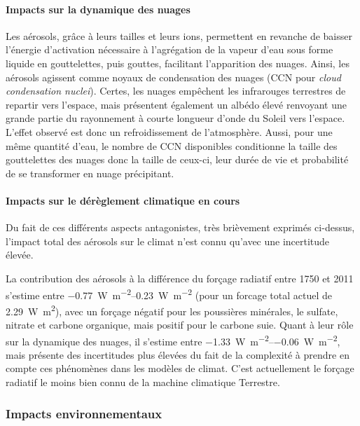 \paragraph{Impacts sur la dynamique des nuages}%
\label{par:noyaux_de_condensation_des_nuages}

Les aérosols, grâce à leurs tailles et leurs ions, permettent en revanche de baisser
l'énergie d'activation nécessaire à l'agrégation de la vapeur d'eau sous forme liquide en
gouttelettes, puis gouttes, facilitant l'apparition des nuages. Ainsi, les aérosols agissent
comme noyaux de condensation des nuages (CCN pour \textit{cloud condensation nuclei}).
Certes, les nuages empêchent les infrarouges terrestres de repartir vers l'espace, mais
présentent également un albédo élevé renvoyant une grande partie du rayonnement à courte
longueur d'onde du Soleil vers l'espace. L'effet observé est donc un refroidissement de
l'atmosphère.
Aussi, pour une même quantité d'eau, le nombre de CCN disponibles conditionne la taille des
gouttelettes des nuages donc la taille de ceux-ci, leur durée de vie et probabilité de se
transformer en nuage précipitant.

\paragraph{Impacts sur le dérèglement climatique en cours}%
\label{par:impacts_sur_le_dereglement_climatique_en_cours}

Du fait de ces différents aspects antagonistes, très brièvement exprimés ci-dessus,
l'impact total des aérosols sur le climat n'est connu qu'avec une incertitude élevée. 

La contribution des aérosols à la différence du forçage radiatif entre 1750 et 2011 s'estime entre
\SIrange[range-phrase=~et~]{-0.77}{0.23}{\W\per\m\squared} (pour un forcage total actuel
de \SI{2.29}{\W\m\squared}), avec un forçage négatif pour
les poussières minérales, le sulfate, nitrate et carbone organique, mais positif pour le
carbone suie.  Quant à leur rôle sur la dynamique des nuages, il s'estime entre
\SIrange[range-phrase=~et~]{-1.33}{-0.06}{\W\per\m\squared}, mais présente des
incertitudes plus élevées du fait de la complexité à prendre en compte ces phénomènes dans
les modèles de climat. C'est actuellement le forçage radiatif le moins bien connu de la
machine climatique Terrestre.

\subsubsection{Impacts environnementaux}%
\label{ssub:impacts_environnementaux}


